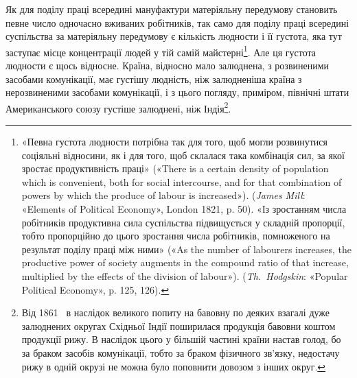Як для поділу праці всередині мануфактури матеріяльну передумову
становить певне число одночасно вживаних робітників,
так само для поділу праці всередині суспільства за матеріяльну
передумову є кількість людности і її густота, яка тут заступає
місце концентрації людей у тій самій майстерні\footnote{
«Певна густота людности потрібна так для того, щоб могли розвинутися
соціяльні відносини, як і для того, щоб склалася така комбінація
сил, за якої зростає продуктивність праці» («There is a certain
density of population which is convenient, both for social intercourse,
and for that combination of powers by which the produce of labour is increased»).
(\emph{James Mill}: «Elements of Political Economy», London 1821,
p. 50). «Із зростанням числа робітників продуктивна сила суспільства
підвищується у складній пропорції, тобто пропорційно до цього зростання
числа робітників, помноженого на результат поділу праці між ними»
(«As the number of labourers increases, the productive power of society
augments in the compound ratio of that increase, multiplied by the
effects of the division of labour»). (\emph{Th.~Hodgskin}: «Popular Political Economy»,
p. 125, 126).
}. Але ця густота
людности є щось відносне. Країна, відносно мало залюднена,
з розвиненими засобами комунікації, має густішу людність, ніж
залюдненіша країна з нерозвиненими засобами комунікації, і з
цього погляду, приміром, північні штати Американського союзу
густіше залюднені, ніж Індія\footnote{
Від 1861~ в наслідок великого попиту на бавовну по деяких
взагалі дуже залюднених округах Східньої Індії поширилася продукція
бавовни коштом продукції рижу. В наслідок цього у більшій частині
країни настав голод, бо за браком засобів комунікації, тобто за браком
фізичного зв'язку, недостачу рижу в одній окрузі не можна було поповнити
довозом з інших округ.
}.

